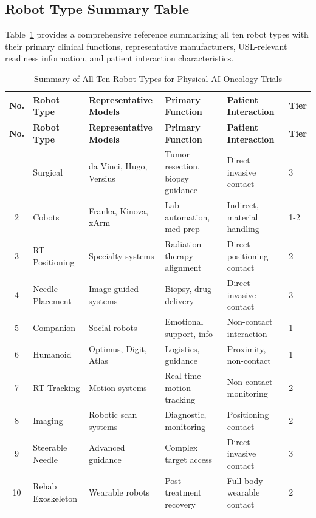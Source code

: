 \subsection{Robot Type Summary Table}
\label{subsec:instructions-summary-table}

Table~\ref{tab:robot-summary} provides a comprehensive reference summarizing all
ten robot types with their primary clinical functions, representative
manufacturers, USL-relevant readiness information, and patient interaction
characteristics.

\begin{longtable}{c p{2.2cm} p{2.5cm} p{2.5cm} p{3cm} l}
\caption{Summary of All Ten Robot Types for Physical AI Oncology Trials}
\label{tab:robot-summary} \\
\toprule
\textbf{No.} & \textbf{Robot Type} & \textbf{Representative Models} & \textbf{Primary Function} & \textbf{Patient Interaction} & \textbf{Tier} \\
\midrule
\endfirsthead
\toprule
\textbf{No.} & \textbf{Robot Type} & \textbf{Representative Models} & \textbf{Primary Function} & \textbf{Patient Interaction} & \textbf{Tier} \\
\midrule
\endhead
\bottomrule
\endfoot
1 & Surgical & da Vinci, Hugo, Versius & Tumor resection, biopsy guidance & Direct invasive contact & 3 \\
2 & Cobots & Franka, Kinova, xArm & Lab automation, med prep & Indirect, material handling & 1-2 \\
3 & RT Positioning & Specialty systems & Radiation therapy alignment & Direct positioning contact & 2 \\
4 & Needle-Placement & Image-guided systems & Biopsy, drug delivery & Direct invasive contact & 3 \\
5 & Companion & Social robots & Emotional support, info & Non-contact interaction & 1 \\
6 & Humanoid & Optimus, Digit, Atlas & Logistics, guidance & Proximity, non-contact & 1 \\
7 & RT Tracking & Motion systems & Real-time motion tracking & Non-contact monitoring & 2 \\
8 & Imaging & Robotic scan systems & Diagnostic, monitoring & Positioning contact & 2 \\
9 & Steerable Needle & Advanced guidance & Complex target access & Direct invasive contact & 3 \\
10 & Rehab Exoskeleton & Wearable robots & Post-treatment recovery & Full-body wearable contact & 2 \\
\end{longtable}

